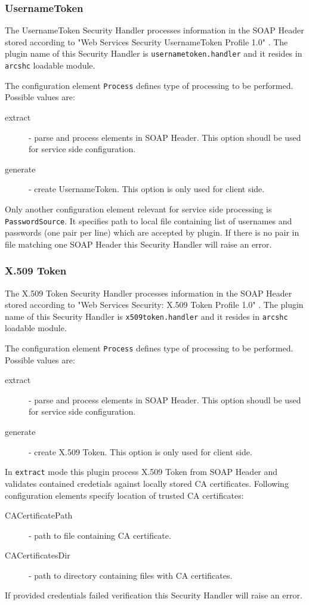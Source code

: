 \documentclass{article}
\begin{document}
\subsubsection{UsernameToken}\label{sec:unametoken-shc}
The UsernameToken Security Handler processes information in the SOAP Header
stored according to "Web Services Security UsernameToken Profile 1.0"
\cite{ws-security-usernametoken}. The plugin name of this Security Handler
is \texttt{usernametoken.handler} and it resides in \texttt{arcshc} loadable
module.

The configuration element \texttt{Process} defines type of processing to
be performed. Possible values are:
\begin{description}
\item[extract] - parse and process elements in SOAP Header. This option
shoudl be used for service side configuration.
\item[generate] - create UsernameToken. This option is only used for client
side.
\end{description}

Only another configuration element relevant for service side processing is
\texttt{PasswordSource}. It specifies path to local file containing
list of usernames and passwords (one pair per line) which are accepted
by plugin. If there is no pair in file matching one SOAP Header this
Security Handler will raise an error.

\subsubsection{X.509 Token}\label{sec:x509token-shc}
The X.509 Token Security Handler processes information in the SOAP Header
stored according to "Web Services Security: X.509 Token Profile 1.0"
\cite{ws-security-x509token}. The plugin name of this Security Handler
is \texttt{x509token.handler} and it resides in \texttt{arcshc} loadable
module.

The configuration element \texttt{Process} defines type of processing to
be performed. Possible values are:
\begin{description}
\item[extract] - parse and process elements in SOAP Header. This option
shoudl be used for service side configuration.
\item[generate] - create X.509 Token. This option is only used for client
side.
\end{description}

In \texttt{extract} mode this plugin process X.509 Token from SOAP Header
and validates contained credetials against locally stored CA certificates.
Following configuration elements specify location of trusted CA certificates:
\begin{description}
\item[CACertificatePath] - path to file containing CA certificate.
\item[CACertificatesDir] - path to directory containing files with CA certificates.
\end{description}
If provided credentials failed verification this Security Handler will raise
an error.
\end{document}
